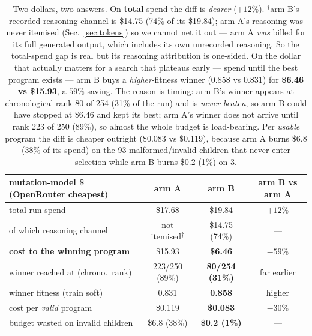 \documentclass[11pt]{article}
\newcommand{\armA}{\textcolor{bad}{arm A}}
\newcommand{\armB}{\textcolor{accent}{arm B}}
\begin{document}
\begin{table}[H]\centering
\begin{tabular}{lccc}
\toprule
mutation-model \$ (OpenRouter cheapest) & \armA{} & \armB{} & \armB{} vs \armA{} \\
\midrule
total run spend & \$17.68 & \$19.84 & $+12\%$ \\
\quad of which reasoning channel & \textcolor{bad}{not itemised$^\dagger$} & \textcolor{bad}{\$14.75 (74\%)} & --- \\
\midrule
\textbf{cost to the winning program} & \$15.93 & \textbf{\textcolor{good}{\$6.46}} & \textbf{$-59\%$} \\
\quad winner reached at (chrono.\ rank) & 223/250 (89\%) & \textbf{\textcolor{good}{80/254 (31\%)}} & far earlier \\
\quad winner fitness (train soft) & 0.831 & \textbf{\textcolor{good}{0.858}} & higher \\
\midrule
cost per \emph{valid} program & \$0.119 & \textbf{\textcolor{good}{\$0.083}} & $-30\%$ \\
budget wasted on invalid children & \textcolor{bad}{\$6.8 (38\%)} & \textbf{\textcolor{good}{\$0.2 (1\%)}} & --- \\
\bottomrule
\end{tabular}
\caption{Two dollars, two answers. On \textbf{total} spend the diff is \emph{dearer} ($+12\%$).
$^\dagger$\armB's recorded reasoning channel is \$14.75 (74\% of its \$19.84); \armA's reasoning
was never itemised (Sec.~\ref{sec:tokens}) so we cannot net it out --- \armA{} \emph{was} billed
for its full generated output, which includes its own unrecorded reasoning. So the total-spend
gap is real but its reasoning attribution is one-sided. On the dollar that
actually matters for a search that plateaus early --- spend until the best program exists ---
\armB{} buys a \emph{higher}-fitness winner (0.858 vs 0.831) for \textbf{\$6.46 vs \$15.93}, a
$59\%$ saving. The reason is timing: \armB's winner appears at chronological rank 80 of 254
(31\% of the run) and is \emph{never beaten}, so \armB{} could have stopped at \$6.46 and kept its
best; \armA's winner does not arrive until rank 223 of 250 (89\%), so almost the whole budget is
load-bearing. Per \emph{usable} program the diff is cheaper outright (\$0.083 vs \$0.119),
because \armA{} burns \$6.8 (38\% of its spend) on the 93 malformed/invalid children that never
enter selection while \armB{} burns \$0.2 (1\%) on 3.}
\end{table}
\end{document}
